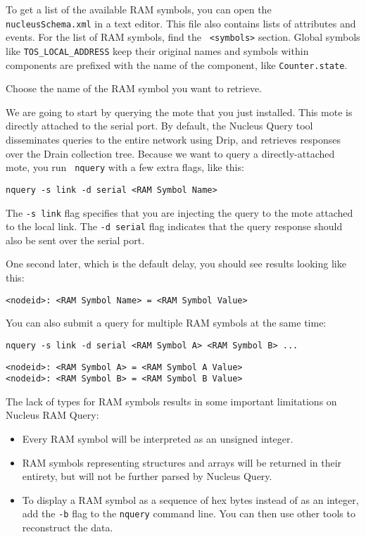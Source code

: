 \documentclass{article}
\begin{document}
To get a list of the available RAM symbols, you can open the {\tt
nucleusSchema.xml} in a text editor. This file also contains lists of
attributes and events. For the list of RAM symbols, find the {\tt
<symbols>} section. Global symbols like {\tt TOS\_LOCAL\_ADDRESS} keep
their original names and symbols within components are prefixed with
the name of the component, like {\tt Counter.state}.

Choose the name of the RAM symbol you want to retrieve.

We are going to start by querying the mote that you just
installed. This mote is directly attached to the serial port.  By
default, the Nucleus Query tool disseminates queries to the entire
network using Drip, and retrieves responses over the Drain collection
tree. Because we want to query a directly-attached mote, you run {\tt
nquery} with a few extra flags, like this:

\begin{verbatim}
nquery -s link -d serial <RAM Symbol Name>
\end{verbatim}

The {\tt -s link} flag specifies that you are injecting the query to
the mote attached to the local link. The {\tt -d serial}
flag indicates that the query response should also be sent over the
serial port.

One second later, which is the default delay, you should see results
looking like this:

\begin{verbatim}
<nodeid>: <RAM Symbol Name> = <RAM Symbol Value>
\end{verbatim}

You can also submit a query for multiple RAM symbols at the same time:

\begin{verbatim}
nquery -s link -d serial <RAM Symbol A> <RAM Symbol B> ...
\end{verbatim}

\begin{verbatim}
<nodeid>: <RAM Symbol A> = <RAM Symbol A Value>
<nodeid>: <RAM Symbol B> = <RAM Symbol B Value>
\end{verbatim}

The lack of types for RAM symbols results in some important
limitations on Nucleus RAM Query:

\begin{itemize}
\item Every RAM symbol will be interpreted as an unsigned integer. 
\item RAM symbols representing structures and arrays will be returned
in their entirety, but will not be further parsed by Nucleus Query.
\item To display a RAM symbol as a sequence of hex bytes instead of as
an integer, add the {\tt -b} flag to the {\tt nquery} command line.
You can then use other tools to reconstruct the data.
\end{itemize}
\end{document}
